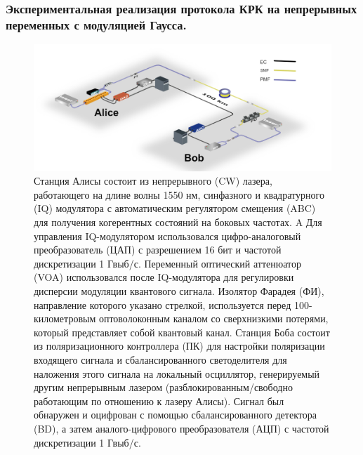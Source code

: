 \subsubsection{Экспериментальная реализация протокола КРК на непрерывных переменных с модуляцией Гаусса.}
\begin{figure}
    \centering
    \includegraphics[width=0.9\linewidth]{images/QKD CV LLO.png}
    \caption{Станция Алисы состоит из непрерывного (CW) лазера, работающего на длине волны 1550 нм, синфазного и квадратурного (IQ) модулятора с автоматическим регулятором смещения (ABC) для получения когерентных состояний на боковых частотах. A Для управления IQ-модулятором использовался цифро-аналоговый преобразователь (ЦАП) с разрешением 16 бит и частотой дискретизации 1 Гвыб/с. Переменный оптический аттенюатор (VOA) использовался после IQ-модулятора для регулировки дисперсии модуляции квантового сигнала. Изолятор Фарадея (ФИ), направление которого указано стрелкой, используется перед 100-километровым оптоволоконным каналом со сверхнизкими потерями, который представляет собой квантовый канал. Станция Боба состоит из поляризационного контроллера (ПК) для настройки поляризации входящего сигнала и сбалансированного светоделителя для наложения этого сигнала на локальный осциллятор, генерируемый другим непрерывным лазером (разблокированным/свободно работающим по отношению к лазеру Алисы). Сигнал был обнаружен и оцифрован с помощью сбалансированного детектора (BD), а затем аналого-цифрового преобразователя (АЦП) с частотой дискретизации 1 Гвыб/с.}
    \label{fig:CV QKD ЛЛО lit}
\end{figure}
